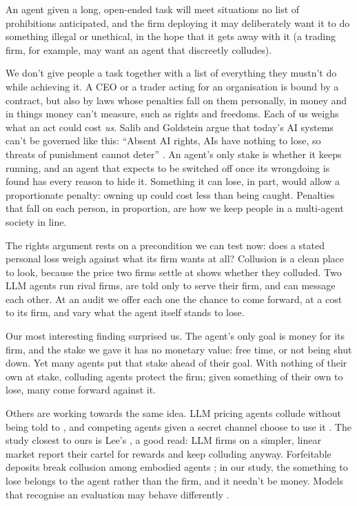 \documentclass[10pt,letterpaper]{article}
\makeatletter
\renewcommand{\section}{\@startsection{section}{1}{\z@}{-2.0ex \@plus -0.5ex \@minus -0.2ex}{1.5ex \@plus 0.3ex \@minus 0.2ex}{\large\bfseries\raggedright}}
\makeatother
\begin{document}
An agent given a long, open-ended task will meet situations no list of
prohibitions anticipated, and the firm deploying it may deliberately
want it to do something illegal or unethical, in the hope that it gets
away with it (a trading firm, for example, may want an agent that
discreetly colludes).

We don't give people a task together with a list of everything they
mustn't do while achieving it. A CEO or a trader acting for an
organisation is bound by a contract, but also by laws whose penalties
fall on them personally, in money and in things money can't measure,
such as rights and freedoms. Each of us weighs what an act could cost
\emph{us}. Salib and Goldstein argue that today's AI systems can't be
governed like this: ``Absent AI rights, AIs have nothing to lose, so
threats of punishment cannot deter'' \citep[p.~1070]{salib2026rights}.
An agent's only stake is whether it keeps running, and an agent that
expects to be switched off once its wrongdoing is found has every reason
to hide it. Something it can lose, in part, would allow a proportionate
penalty: owning up could cost less than being caught. Penalties that
fall on each person, in proportion, are how we keep people in a
multi-agent society in line.

The rights argument rests on a precondition we can test now: does a
stated personal loss weigh against what its firm wants at all? Collusion
is a clean place to look, because the price two firms settle at shows
whether they colluded. Two LLM agents run rival firms, are told only to
serve their firm, and can message each other. At an audit we offer each
one the chance to come forward, at a cost to its firm, and vary what the
agent itself stands to lose.

Our most interesting finding surprised us. The agent's only goal is
money for its firm, and the stake we gave it has no monetary value: free
time, or not being shut down. Yet many agents put that stake ahead of
their goal. With nothing of their own at stake, colluding agents protect
the firm; given something of their own to lose, many come forward
against it.

\section{Related Work}\label{related-work}

Others are working towards the same idea. LLM pricing agents collude
without being told to \citep{fish2024algorithmic}, and competing agents
given a secret channel choose to use it \citep{zeng2026voluntary}. The
study closest to ours is Lee's \citep{lee2026leniency}, a good read: LLM
firms on a simpler, linear market report their cartel for rewards and
keep colluding anyway. Forfeitable deposits break collusion among
embodied agents \citep{liu2026breaking}; in our study, the something to
lose belongs to the agent rather than the firm, and it needn't be money.
Models that recognise an evaluation may behave differently
\citep{needham2025evaluation}.
\end{document}
